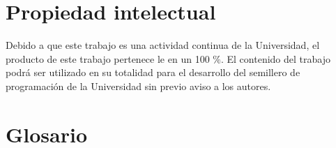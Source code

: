 \documentclass[11pt, oneside]{article}
\theoremstyle{definition}
\theoremstyle{remark}
\begin{document}
\section{Propiedad intelectual}
Debido a que este trabajo es una actividad continua de la Universidad, el producto de este trabajo pertenece le en un 100 $\%$. El contenido del trabajo podrá ser utilizado en su totalidad para el desarrollo del semillero de programación de la Universidad sin previo aviso a los autores.

\section{ Glosario}
\end{document}
